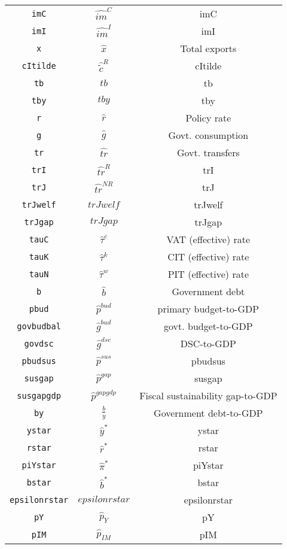 \begin{center}
\begin{longtable}{ccc}
\texttt{imC} & $\hat{im}^C$ & imC\\
\texttt{imI} & $\hat{im}^I$ & imI\\
\texttt{x} & $\hat{x}$ & Total exports\\
\texttt{cItilde} & $\hat{\tilde{c}}^R$ & cItilde\\
\texttt{tb} & $tb$ & tb\\
\texttt{tby} & $tby$ & tby\\
\texttt{r} & $\hat{r}$ & Policy rate\\
\texttt{g} & $\hat{g}$ & Govt. consumption\\
\texttt{tr} & $\hat{tr}$ & Govt. transfers\\
\texttt{trI} & $\hat{tr}^R$ & trI\\
\texttt{trJ} & $\hat{tr}^{NR}$ & trJ\\
\texttt{trJwelf} & $trJwelf$ & trJwelf\\
\texttt{trJgap} & $trJgap$ & trJgap\\
\texttt{tauC} & $\hat{\tau}^c$ & VAT (effective) rate\\
\texttt{tauK} & $\hat{\tau}^k$ & CIT (effective) rate\\
\texttt{tauN} & $\hat{\tau}^w$ & PIT (effective) rate\\
\texttt{b} & $\hat{b}$ & Government debt\\
\texttt{pbud} & $\hat{p}^{bud}$ & primary budget-to-GDP\\
\texttt{govbudbal} & $\hat{g}^{bud}$ & govt. budget-to-GDP\\
\texttt{govdsc} & $\hat{g}^{dsc}$ & DSC-to-GDP\\
\texttt{pbudsus} & $\hat{p}^{sus}$ & pbudsus\\
\texttt{susgap} & $\hat{p}^{gap}$ & susgap\\
\texttt{susgapgdp} & $\hat{p}^{gapgdp}$ & Fiscal sustainability gap-to-GDP\\
\texttt{by} & $\frac{b}{y}$ & Government debt-to-GDP\\
\texttt{ystar} & $\hat{y}^*$ & ystar\\
\texttt{rstar} & $\hat{r}^*$ & rstar\\
\texttt{piYstar} & $\hat{\pi}^*$ & piYstar\\
\texttt{bstar} & $\hat{b}^*$ & bstar\\
\texttt{epsilonrstar} & $epsilonrstar$ & epsilonrstar\\
\texttt{pY} & $\hat{p}_Y$ & pY\\
\texttt{pIM} & $\hat{p}_{IM}$ & pIM\\

\end{longtable}
\end{center}
